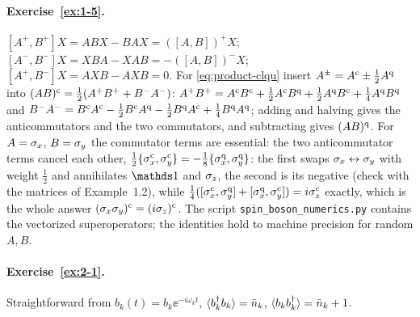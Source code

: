 \paragraph{Exercise~\ref{ex:1-5}.}
$[A^+,B^+]X=ABX-BAX=([A,B])^+X$; $[A^-,B^-]X=XBA-XAB=-([A,B])^-X$; $[A^+,B^-]X=AXB-AXB=0$.
For \cref{eq:product-clqu} insert $A^\pm=A^{\mathrm{c}}\pm\tfrac12A^{\mathrm{q}}$ into $(AB)^{\mathrm{c}}=\tfrac12(A^+B^++B^-A^-)$: $A^+B^+=A^{\mathrm{c}} B^{\mathrm{c}}+\tfrac12A^{\mathrm{c}} B^{\mathrm{q}}+\tfrac12A^{\mathrm{q}} B^{\mathrm{c}}+\tfrac14A^{\mathrm{q}} B^{\mathrm{q}}$ and $B^-A^-=B^{\mathrm{c}} A^{\mathrm{c}}-\tfrac12B^{\mathrm{c}} A^{\mathrm{q}}-\tfrac12B^{\mathrm{q}} A^{\mathrm{c}}+\tfrac14B^{\mathrm{q}} A^{\mathrm{q}}$; adding and halving gives the anticommutators and the two commutators, and subtracting gives $(AB)^{\mathrm{q}}$.
For $A=\sigma_x$, $B=\sigma_y$ the commutator terms are essential: the two anticommutator terms cancel each other, $\tfrac12\{\sigma_x^{\mathrm{c}},\sigma_y^{\mathrm{c}}\}=-\tfrac18\{\sigma_x^{\mathrm{q}},\sigma_y^{\mathrm{q}}\}$: the first swaps $\sigma_x\leftrightarrow\sigma_y$ with weight $\tfrac12$ and annihilates $\Id$ and $\sigma_z$, the second is its negative (check with the matrices of Example~1.2), while $\tfrac14([\sigma_x^{\mathrm{c}},\sigma_y^{\mathrm{q}}]+[\sigma_x^{\mathrm{q}},\sigma_y^{\mathrm{c}}])=i\sigma_z^{\mathrm{c}}$ exactly, which is the whole answer $(\sigma_x\sigma_y)^{\mathrm{c}}=(i\sigma_z)^{\mathrm{c}}$.
The script \texttt{spin\_boson\_numerics.py} contains the vectorized superoperators; the identities hold to machine precision for random $A,B$.

\paragraph{Exercise~\ref{ex:2-1}.}
Straightforward from $b_k(t)=b_k\ee^{-i\omega_kt}$, $\langle b_k^\dagger b_k\rangle=\bar n_k$, $\langle b_kb_k^\dagger\rangle=\bar n_k+1$.

